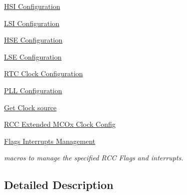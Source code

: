 \begin{DoxyCompactItemize}
\hyperlink{group___r_c_c___h_s_i___configuration}{H\+S\+I Configuration}
\item 
\hyperlink{group___r_c_c___l_s_i___configuration}{L\+S\+I Configuration}
\item 
\hyperlink{group___r_c_c___h_s_e___configuration}{H\+S\+E Configuration}
\item 
\hyperlink{group___r_c_c___l_s_e___configuration}{L\+S\+E Configuration}
\item 
\hyperlink{group___r_c_c___internal___r_t_c___clock___configuration}{R\+T\+C Clock Configuration}
\item 
\hyperlink{group___r_c_c___p_l_l___configuration}{P\+L\+L Configuration}
\item 
\hyperlink{group___r_c_c___get___clock__source}{Get Clock source}
\item 
\hyperlink{group___r_c_c_ex___m_c_ox___clock___config}{R\+C\+C Extended M\+C\+Ox Clock Config}
\item 
\hyperlink{group___r_c_c___flags___interrupts___management}{Flags Interrupts Management}
\begin{DoxyCompactList}\small\item\em macros to manage the specified R\+CC Flags and interrupts. \end{DoxyCompactList}\end{DoxyCompactItemize}


\subsection{Detailed Description}
